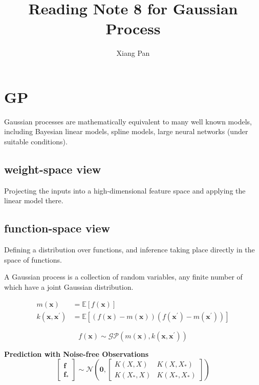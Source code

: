 \documentclass{article}
\title{Reading Note 8 for Gaussian Process}
\author{Xiang Pan}
\begin{document}
\section{GP}
Gaussian processes are mathematically equivalent to many well known models, including Bayesian linear models, spline models, large neural networks (under suitable conditions).

\subsection{weight-space view}
Projecting the inputs into a high-dimensional feature space and applying the linear model there.
\subsection{function-space view}
 Defining a distribution over functions, and inference taking place directly in the space of functions.

 A Gaussian process is a collection of random variables, any ﬁnite number of which have a joint Gaussian distribution.

 \begin{equation}
    \begin{aligned}
    m(\mathbf{x}) &=\mathbb{E}[f(\mathbf{x})] \\
    k\left(\mathbf{x}, \mathbf{x}^{\prime}\right) &=\mathbb{E}\left[(f(\mathbf{x})-m(\mathbf{x}))\left(f\left(\mathbf{x}^{\prime}\right)-m\left(\mathbf{x}^{\prime}\right)\right)\right]
    \end{aligned}
\end{equation}

\begin{equation}
    f(\mathbf{x}) \sim \mathcal{G P}\left(m(\mathbf{x}), k\left(\mathbf{x}, \mathbf{x}^{\prime}\right)\right)
\end{equation}

\textbf{Prediction with Noise-free Observations}
\begin{equation}
    \left[\begin{array}{c}
    \mathbf{f} \\
    \mathbf{f}_{*}
    \end{array}\right] \sim \mathcal{N}\left(\mathbf{0},\left[\begin{array}{ll}
    K(X, X) & K\left(X, X_{*}\right) \\
    K\left(X_{*}, X\right) & K\left(X_{*}, X_{*}\right)
    \end{array}\right]\right)
\end{equation}
\end{document}
